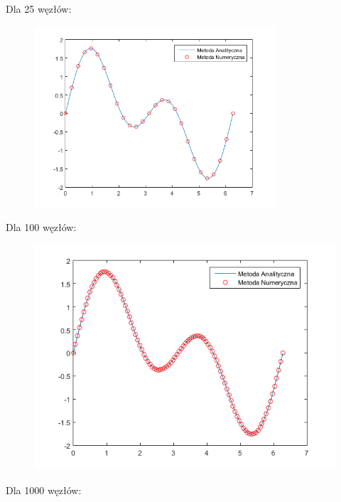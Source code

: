 Dla 25 węzłów:

\begin{figure}[!ht]
	\begin{center}
		\includegraphics[width=0.8\textwidth]{Lab3/charts/zad1/25.png}
	\end{center}
\end{figure}

\newpage

Dla 100 węzłów:
	

\begin{figure}[!ht]
	\begin{center}
		\includegraphics[width=1\textwidth]{Lab3/charts/zad1/100.png}
	\end{center}
\end{figure}



Dla 1000 węzłów:

